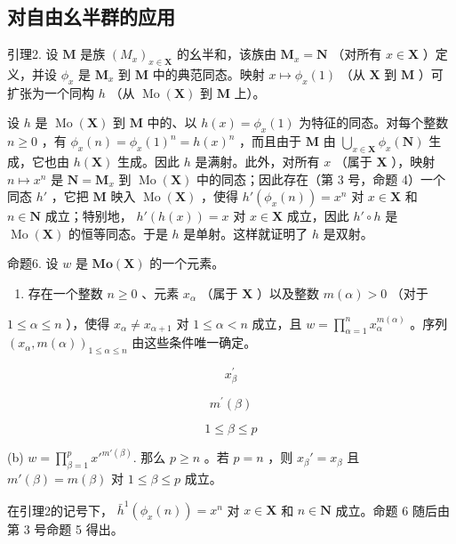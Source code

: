\subsection{对自由幺半群的应用}

引理2. 设 \(\mathbf{M}\) 是族 \((M_x)_{x\in \mathbf{X}}\) 的幺半和，该族由 \(\mathbf{M}_x = \mathbf{N}\) （对所有 \(x\in \mathbf{X}\) ）定义，并设 \(\phi_{x}\) 是 \(\mathbf{M}_x\) 到 \(\mathbf{M}\) 中的典范同态。映射 \(x\mapsto \phi_x(1)\) （从 \(\mathbf{X}\) 到 \(\mathbf{M}\) ）可扩张为一个同构 \(h\) （从 \(\operatorname {Mo}(\mathbf{X})\) 到 \(\mathbf{M}\) 上）。

设 \(h\) 是 \(\operatorname{Mo}(\mathbf{X})\) 到 \(\mathbf{M}\) 中的、以 \(h(x) = \phi_x(1)\) 为特征的同态。对每个整数 \(n \geqslant 0\) ，有 \(\phi_x(n) = \phi_x(1)^n = h(x)^n\) ，而且由于 \(\mathbf{M}\) 由 \(\bigcup_{x \in \mathbf{X}} \phi_x(\mathbf{N})\) 生成，它也由 \(h(\mathbf{X})\) 生成。因此 \(h\) 是满射。此外，对所有 \(x\) （属于 \(\mathbf{X}\) ），映射 \(n \mapsto x^n\) 是 \(\mathbf{N} = \mathbf{M}_x\) 到 \(\operatorname{Mo}(\mathbf{X})\) 中的同态；因此存在（第 3 号，命题 4）一个同态 \(h'\) ，它把 \(\mathbf{M}\) 映入 \(\operatorname{Mo}(\mathbf{X})\) ，使得 \(h'(\phi_x(n)) = x^n\) 对 \(x \in \mathbf{X}\) 和 \(n \in \mathbf{N}\) 成立；特别地， \(h'(h(x)) = x\) 对 \(x \in \mathbf{X}\) 成立，因此 \(h' \circ h\) 是 \(\operatorname{Mo}(\mathbf{X})\) 的恒等同态。于是 \(h\) 是单射。这样就证明了 \(h\) 是双射。

命题6. 设 \(w\) 是 \(\mathbf{Mo}(\mathbf{X})\) 的一个元素。

\begin{enumerate}
\def\labelenumi{(\alph{enumi})}
\tightlist
\item
  存在一个整数 \(n \geqslant 0\) 、元素 \(x_{\alpha}\) （属于 \(\mathbf{X}\) ）以及整数 \(m(\alpha) > 0\) （对于
\end{enumerate}

\(1 \leqslant \alpha \leqslant n\) ），使得 \(x_{\alpha} \neq x_{\alpha + 1}\) 对 \(1 \leqslant \alpha < n\) 成立，且 \(w = \prod_{\alpha = 1}^{n} x_{\alpha}^{m(\alpha)}\) 。序列 \((x_{\alpha}, m(\alpha))_{1 \leqslant \alpha \leqslant n}\) 由这些条件唯一确定。

\[
x _ {\beta} ^ {\prime}
\]

\[
m ^ {\prime} (\beta)
\]

\[
1 \leqslant \beta \leqslant p
\]

(b) \(w = \prod_{\beta=1}^{p} x'^{m'(\beta)}.\) 那么 \(p \geqslant n\) 。若 \(p = n\) ，则 \(x_{\beta}' = x_{\beta}\) 且 \(m'(\beta) = m(\beta)\) 对 \(1 \leqslant \beta \leqslant p\) 成立。

在引理2的记号下， \(\bar{h}^{1}(\phi_x(n)) = x^n\) 对 \(x \in \mathbf{X}\) 和 \(n \in \mathbf{N}\) 成立。命题 6 随后由第 3 号命题 5 得出。

